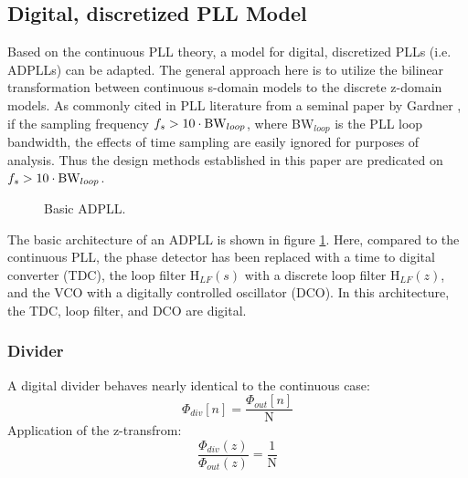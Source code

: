 \subsection{Digital, discretized PLL Model}
Based on the continuous PLL theory, a model for digital, discretized PLLs (i.e. ADPLLs) can be adapted. The general approach here is to utilize the bilinear transformation between continuous s-domain models to the discrete z-domain models. As commonly cited in PLL literature from a seminal paper by Gardner \cite{gardner_1980}, if the sampling frequency $f_s > 10\cdot\textnormal{BW}_{loop}$, where BW$_{loop}$ is the PLL loop bandwidth, the effects of time sampling are easily ignored for purposes of analysis. Thus the design methods established in this paper are predicated on $f_s > 10\cdot\textnormal{BW}_{loop}$.
\begin{figure}[htb!]
	\center
	\caption{Basic ADPLL.}
	\label{fig:basic_adpll}
\end{figure}
\FloatBarrier
The basic architecture of an ADPLL is shown in figure \ref{fig:basic_adpll}. Here, compared to the continuous PLL, the phase detector has been replaced with a time to digital converter (TDC), the loop filter $\mathrm{H}_{LF}(s)$ with a discrete loop filter $\mathrm{H}_{LF}(z)$, and the VCO with a digitally controlled oscillator (DCO). In this architecture, the TDC, loop filter, and DCO are digital. 

\subsubsection{Divider}
A digital divider behaves nearly identical to the continuous case:
\begin{equation}
	\Phi_{div}[n] = \frac{\Phi_{out}[n]}{\mathrm{N}}
\end{equation}
Application of the z-transfrom:
\begin{equation}
	\frac{\Phi_{div}(z)}{\Phi_{out}(z)} = \frac{1}{\mathrm{N}}
\end{equation}
